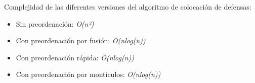 Complejidad de las diferentes versiones del algoritmo de colocación de defensas:

\begin{itemize}
\item Sin preordenación: \textit{O(n²)}
\item Con preordenación por fusión: \textit{O(nlog(n))}
\item Con preordenación rápida: \textit{O(nlog(n))}
\item Con preordenación por montículos: \textit{O(nlog(n))}
\end{itemize}
